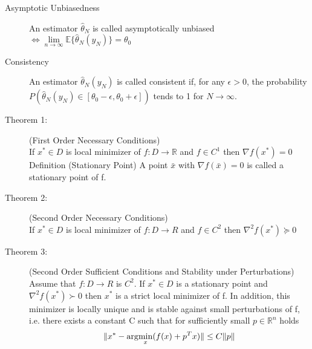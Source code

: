 \begin{tcolorbox}[colback=cyan!5!white,colframe=cyan!75!black,title=\textbf{Useful statistic definitions}]
\begin{description}
	\item[\small Asymptotic Unbiasedness]  An estimator $\hat \theta_N$ is called asymptotically unbiased $\Leftrightarrow \lim\limits_{n \to \infty} \mathbb{E}\{\hat \theta_N (y_N) \} = \theta_0$
	
	\item[\small Consistency] An estimator $\hat \theta_N (y_N)$ is called consistent if, for any $\epsilon > 0$, the probability $P(\hat \theta_N (y_N) \in [\theta_0 - \epsilon, \theta_0 + \epsilon])$ tends to 1 for $N \rightarrow \infty$.
\end{description}
\end{tcolorbox}

\begin{tcolorbox}[colback=blue!5!white,colframe=blue!75!black,title=\textbf{Unconstrainded Optimization}]
\begin{description}
	\item[\small Theorem 1:](First Order Necessary Conditions)\\
		If $x^* \in D$ is local minimizer of $f : D \rightarrow \mathbb{R}$ and $f \in C^1$ then
		$\nabla f (x^*) = 0$
		Definition (Stationary Point) A point $\bar{x}$ with $\nabla f(\bar{x}) = 0$ is called a stationary point of f.
	
	\item[\small Theorem 2:] (Second Order Necessary Conditions)\\
		If $x^* \in D$ is local minimizer of $f : D \rightarrow R$ and $f \in C^2$ then
		$\nabla^2 f(x^*) \succeq 0$
	
	\item[\small Theorem 3:] (Second Order Sufficient Conditions and Stability under Perturbations)\\
		Assume that $f : D \rightarrow R$ is $C^2.$ If $x^* \in D$ is a stationary point and
		$ \nabla^2 f(x^*) \succ 0$
		then $x^*$ is a strict local minimizer of f. In addition, this minimizer is locally unique and is stable against small perturbations of f, i.e. there exists a constant C such that for sufficiently small $p \in \mathbb{R}^n$ holds\\
		\begin{equation*}
		\lVert{x^* - \arg\!\min_x  (f(x) + p^T x)}\rVert \leq C \lVert p \rVert
		\end{equation*}	
\end{description}
\end{tcolorbox}
